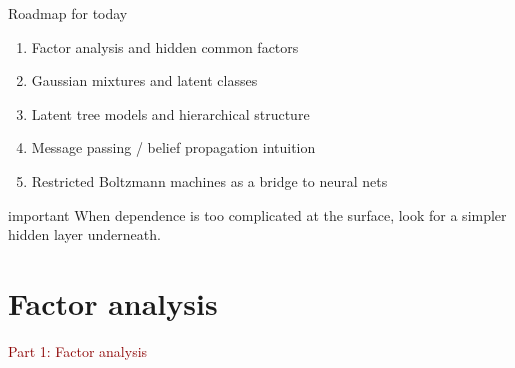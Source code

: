 \documentclass[dvipsnames,aspectratio=169,handout]{beamer}
\begin{document}
\begin{frame}{Roadmap for today}
\begin{enumerate}
    \item Factor analysis and hidden common factors
    \item Gaussian mixtures and latent classes
    \item Latent tree models and hierarchical structure
    \item Message passing / belief propagation intuition
    \item Restricted Boltzmann machines as a bridge to neural nets
\end{enumerate}

\vspace{2mm}
\begin{beamercolorbox}[wd=\textwidth,sep=7pt,center,rounded=true,shadow=true]{important}
When dependence is too complicated at the surface, look for a simpler hidden layer underneath.
\end{beamercolorbox}
\end{frame}


\section{Factor analysis}

\begin{frame}{}
\begin{center}
{\Huge \textcolor{DarkRed}{Part 1: Factor analysis}}
\end{center}
\end{frame}
\end{document}
